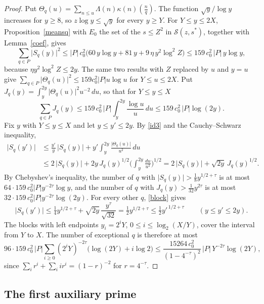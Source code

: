 \begin{proof}
Put $\Theta_q(u)=\sum_{n\le u}\Lambda(n)\kappa(n)(\frac nq)$. The function $\sqrt y/\log y$ increases for $y\ge8$, so $z\log y\le\sqrt y$ for every $y\ge Y$. For $Y\le y\le2X$, Proposition~\ref{meansq} with $E_0$ the set of the $s\le Z^2$ in $\mathcal S(z,s^\ast)$, together with Lemma~\ref{coef}, gives
\[
\sum_{q\in P}\lvert S_q(y)\rvert^2\le\lvert P\rvert\,c_0^2\Big(60\,y\log y+81\,y+9\,\eta\,y^2\log^2Z\Big)\le159\,c_0^2\,\lvert P\rvert\,y\log y ,
\]
because $\eta y^2\log^2Z\le2y$. The same two results with $Z$ replaced by $u$ and $y=u$ give $\sum_{q\in P}\lvert\Theta_q(u)\rvert^2\le159c_0^2\lvert P\rvert u\log u$ for $Y\le u\le2X$. Put $J_q(y)=\int_y^{2y}\lvert\Theta_q(u)\rvert^2u^{-2}\,du$, so that for $Y\le y\le X$
\[
\sum_{q\in P}J_q(y)\le159\,c_0^2\,\lvert P\rvert\int_y^{2y}\frac{\log u}u\,du\le159\,c_0^2\,\lvert P\rvert\log(2y).
\]
Fix $y$ with $Y\le y\le X$ and let $y\le y'\le2y$. By \eqref{id3} and the Cauchy--Schwarz inequality,
\begin{equation}\label{block}
\begin{aligned}
\lvert S_q(y')\rvert&\le\frac{y'}y\,\lvert S_q(y)\rvert+y'\int_y^{2y}\frac{\lvert\Theta_q(u)\rvert}{u^2}\,du\\
&\le2\,\lvert S_q(y)\rvert+2y\,J_q(y)^{1/2}\Big(\int_y^{2y}\frac{du}{u^2}\Big)^{1/2}=2\,\lvert S_q(y)\rvert+\sqrt{2y}\,J_q(y)^{1/2}.
\end{aligned}
\end{equation}
By Chebyshev's inequality, the number of $q$ with $\lvert S_q(y)\rvert>\frac18y^{1/2+\tau}$ is at most $64\cdot159\,c_0^2\lvert P\rvert y^{-2\tau}\log y$, and the number of $q$ with $J_q(y)>\frac1{32}y^{2\tau}$ is at most $32\cdot159\,c_0^2\lvert P\rvert y^{-2\tau}\log(2y)$. For every other $q$, \eqref{block} gives
\[
\lvert S_q(y')\rvert\le\tfrac14y^{1/2+\tau}+\sqrt{2y}\,\frac{y^{\tau}}{\sqrt{32}}=\tfrac12y^{1/2+\tau}\le\tfrac12y'^{\,1/2+\tau}\qquad(y\le y'\le2y).
\]
The blocks with left endpoints $y_i=2^iY$, $0\le i\le\log_2(X/Y)$, cover the interval from $Y$ to $X$. The number of exceptional $q$ is therefore at most
\[
96\cdot159\,c_0^2\,\lvert P\rvert\sum_{i\ge0}(2^iY)^{-2\tau}\big(\log(2Y)+i\log2\big)\le\frac{15264\,c_0^2}{(1-4^{-\tau})^2}\,\lvert P\rvert\,Y^{-2\tau}\log(2Y),
\]
since $\sum_ir^i+\sum_iir^i=(1-r)^{-2}$ for $r=4^{-\tau}$.
\end{proof}

\subsection{The first auxiliary prime}

